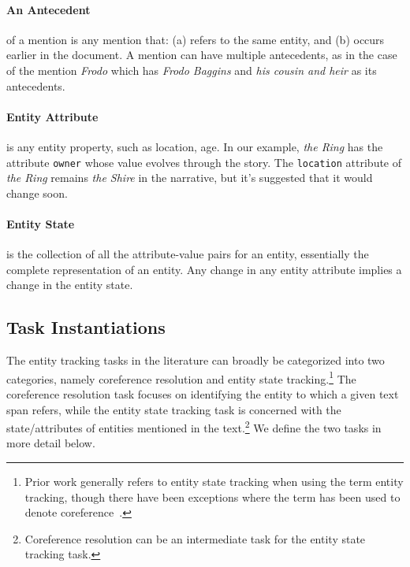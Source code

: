 \documentclass[12pt]{thesis-umich}[thesis]
\begin{document}
\paragraph{An Antecedent} of a mention is any mention that: (a) refers to the same entity, and (b) occurs earlier in the document. A mention can have multiple antecedents, as in the case of the mention \emph{Frodo}  which has  \emph{Frodo Baggins} and \emph{his cousin and heir} as its antecedents.

\paragraph{Entity Attribute} is any entity property, such as location, age. 
In our example, \emph{the Ring} has the attribute \texttt{owner} whose value evolves through the story. The \texttt{location} attribute of \emph{the Ring} remains \emph{the Shire} in the narrative, but it's suggested that it would change soon. 


\paragraph{Entity State} is the collection of all the attribute-value pairs for an entity, essentially the complete  representation of an entity. Any change in any entity attribute implies a change in the entity state. 




\subsection{Task Instantiations}
The entity tracking tasks in the literature can broadly be categorized into two categories, namely coreference resolution and entity state tracking.\footnote{Prior work generally refers to entity state tracking when using the term entity tracking, though there have been exceptions where the term has been used to denote coreference~\cite{hoang-etal-2018-entity, clark-etal-2018-neural}.} 
The coreference resolution task focuses on identifying the entity to which a given text span refers, while the entity state tracking task is concerned with the state/attributes of entities mentioned in the text.\footnote{Coreference resolution can be an intermediate task for the entity state tracking task.} 
We define the two tasks in more detail below. 
\end{document}
